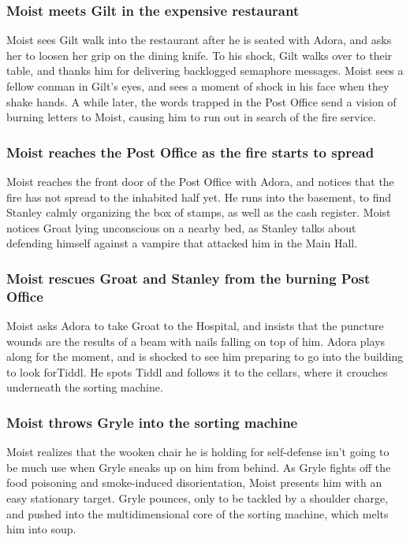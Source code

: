 \subsubsection{\Gls{Moist} meets \Gls{Gilt} in the expensive restaurant}
\Gls{Moist} sees \Gls{Gilt} walk into the restaurant after he is seated with \Gls{Adora}, and asks
her to loosen her grip on the dining knife. To his shock, \Gls{Gilt} walks over to their table, and
thanks him for delivering backlogged semaphore messages. \Gls{Moist} sees a fellow conman in
\Gls{Gilt}'s eyes, and sees a moment of shock in his face when they shake hands. A while later,
the words trapped in the Post Office send a vision of burning letters to \Gls{Moist}, causing him
to run out in search of the fire service.

\subsubsection{\Gls{Moist} reaches the Post Office as the fire starts to spread}
\Gls{Moist} reaches the front door of the Post Office with \Gls{Adora}, and notices that the fire
has not spread to the inhabited half yet. He runs into the basement, to find \Gls{Stanley} calmly
organizing the box of stamps, as well as the cash register. \Gls{Moist} notices \Gls{Groat} lying
unconscious on a nearby bed, as \Gls{Stanley} talks about defending himself against a vampire
that attacked him in the Main Hall.

\subsubsection{\Gls{Moist} rescues \Gls{Groat} and \Gls{Stanley} from the burning Post Office}
\Gls{Moist} asks \Gls{Adora} to take \Gls{Groat} to the Hospital, and insists that the puncture
wounds are the results of a beam with nails falling on top of him. \Gls{Adora} plays along for the
moment, and is shocked to see him preparing to go into the building to look for\Gls{Tiddl}. He
spots \Gls{Tiddl} and follows it to the cellars, where it crouches underneath the sorting machine.

\subsubsection{\Gls{Moist} throws \Gls{Gryle} into the sorting machine}
\Gls{Moist} realizes that the wooken chair he is holding for self-defense isn't going to be much
use when \Gls{Gryle} sneaks up on him from behind. As \Gls{Gryle} fights off the food poisoning and
smoke-induced disorientation, \Gls{Moist} presents him with an easy stationary target. \Gls{Gryle}
pounces, only to be tackled by a shoulder charge, and pushed into the multidimensional core of the
sorting machine, which melts him into soup.


